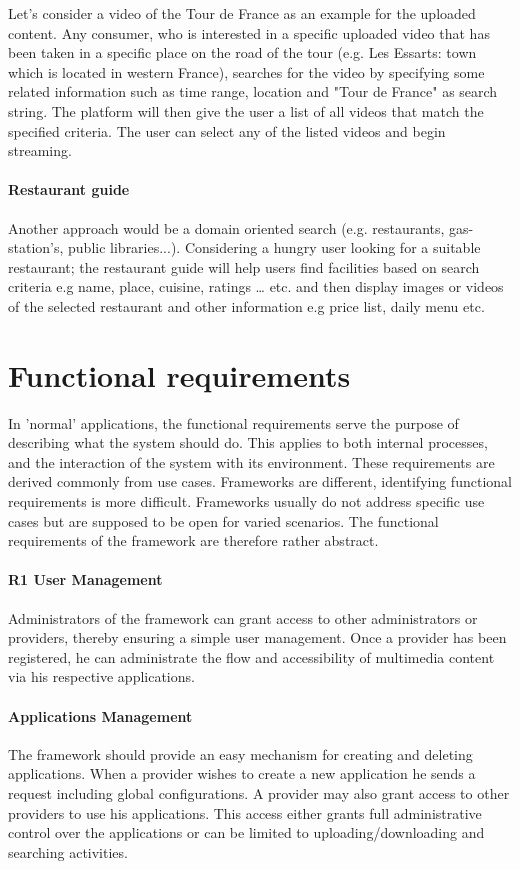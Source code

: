 Let's consider a video of the Tour de France as an example for the uploaded content. Any consumer, who is interested in a specific uploaded video that has been taken in a specific place on the road of the tour (e.g. Les Essarts: town which is located in western France), searches for the video by specifying some related information such as time range, location and "Tour de France" as search string. The platform will then give the user a list of all videos that match the specified criteria. The user can select any of the listed videos and begin streaming.

\paragraph{Restaurant guide}

Another approach would be a domain oriented search (e.g. restaurants, gas-station's, public libraries...). Considering a hungry user looking for a suitable restaurant; the restaurant guide will help users find facilities based on search criteria e.g name, place, cuisine, ratings … etc. and then display images or videos of the selected restaurant and other information e.g price list, daily menu etc.

\section{Functional requirements\label{sec:req_f_req}}

In 'normal' applications, the functional requirements serve the purpose of describing what the system should do. This applies to both internal processes, and the interaction of the system with its environment. These requirements are derived commonly from use cases. Frameworks are different, identifying functional requirements is more difficult. Frameworks usually do not address specific use cases but are supposed to be open for varied scenarios. The functional requirements of the framework are therefore rather abstract.

\paragraph{R1 User Management}
Administrators of the framework can grant access to other administrators or providers, thereby ensuring a simple user management. Once a provider has been registered, he can administrate the flow and accessibility of multimedia content via his respective applications.

\paragraph{Applications Management}
The framework should provide an easy mechanism for creating and deleting applications. When a provider wishes to create a new application he sends a request including global configurations. A provider may also grant access to other providers to use his applications. This access either grants full administrative control over the applications or can be limited to uploading/downloading and searching activities. 

